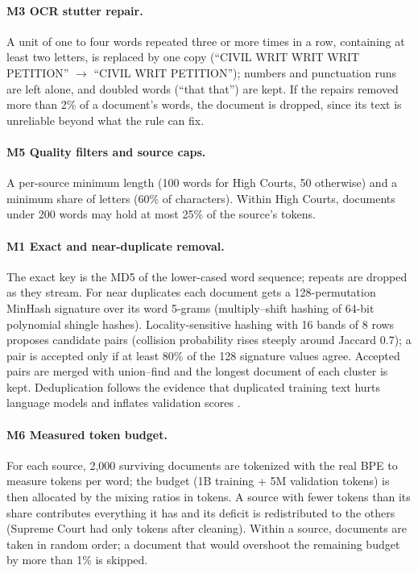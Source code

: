 \documentclass[11pt,a4paper]{article}
\begin{document}
\paragraph{M3 OCR stutter repair.} A unit of one to four words repeated three or more times in a row,
containing at least two letters, is replaced by one copy (``CIVIL WRIT WRIT WRIT PETITION'' $\to$ ``CIVIL WRIT
PETITION''); numbers and punctuation runs are left alone, and doubled words (``that that'') are kept.  If the
repairs removed more than 2\% of a document's words, the document is dropped, since its text is unreliable
beyond what the rule can fix.

\paragraph{M5 Quality filters and source caps.} A per-source minimum length (100 words for High Courts,
50 otherwise) and a minimum share of letters (60\% of characters).  Within High Courts, documents under 200
words may hold at most 25\% of the source's tokens.

\paragraph{M1 Exact and near-duplicate removal.} The exact key is the MD5 of the lower-cased word sequence;
repeats are dropped as they stream.  For near duplicates each document gets a 128-permutation MinHash
signature \cite{broder1997resemblance} over its word 5-grams (multiply--shift hashing of 64-bit
polynomial shingle hashes).  Locality-sensitive hashing with 16 bands of 8 rows \cite{leskovec2014mmds}
proposes candidate pairs (collision probability rises steeply around Jaccard 0.7); a pair is accepted only if
at least 80\% of the 128 signature values agree.  Accepted pairs are merged with union--find and the longest
document of each cluster is kept.  Deduplication follows the evidence that duplicated training text hurts
language models and inflates validation scores \cite{lee2022dedup}.

\paragraph{M6 Measured token budget.} For each source, 2{,}000 surviving documents are tokenized with the
real BPE to measure tokens per word; the budget (1B training + 5M validation tokens) is then allocated by the
mixing ratios in tokens.  A source with fewer tokens than its share contributes everything it has and its
deficit is redistributed to the others (Supreme Court had only \scavailable{} tokens after cleaning).
Within a source, documents are taken in random order; a document that would overshoot the remaining budget
by more than 1\% is skipped.
\end{document}
